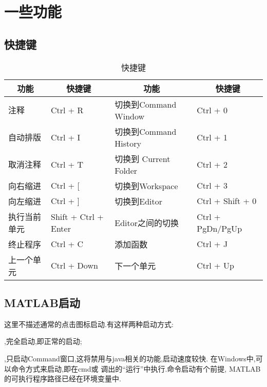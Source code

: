 \section{一些功能}

\subsection{快捷键}

\begin{center}
\begin{table}[htbp!]
  \centering
  \caption{快捷键}
    \begin{tabular}{ll|ll}
    \toprule
    \multicolumn{1}{c}{功能}    & \multicolumn{1}{c}{快捷键}   & \multicolumn{1}{c}{功能}    & \multicolumn{1}{c}{快捷键}\\
    \midrule
    注释          & Ctrl + R              & 切换到Command Window   & Ctrl + 0  \\
    自动排版      & Ctrl + I              & 切换到Command History  & Ctrl + 1 \\
    取消注释      & Ctrl + T              & 切换到 Current Folder  & Ctrl + 2  \\
    向右缩进      & Ctrl + [              & 切换到Workspace        & Ctrl + 3 \\
    向左缩进      & Ctrl + ]              & 切换到Editor           & Ctrl + Shift + 0 \\
    执行当前单元  & Shift + Ctrl + Enter  & Editor之间的切换       & Ctrl + PgDn/PgUp \\
    终止程序      & Ctrl + C              & 添加函数               & Ctrl + J \\
    上一个单元    & Ctrl + Down           & 下一个单元             & Ctrl + Up \\
    \bottomrule
    \end{tabular}%
\end{table}%
\end{center}



\subsection{MATLAB启动}
这里不描述通常的点击图标启动.有这样两种启动方式:
\begindot
  \item {},完全启动,即正常的启动;
  \item {},只启动Command窗口,这将禁用与java相关的功能,启动速度较快.
\myenddot
在Windows中,可以命令方式来启动,即在cmd或  调出的“运行”中执行.命令启动有个前提, MATLAB的可执行程序路径已经在环境变量中.\par

